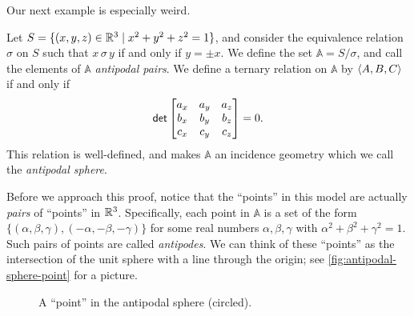 Our next example is especially weird.

\begin{prop}
Let \(S = \{ (x,y,z) \in \mathbb{R}^3 \mid x^2 + y^2 + z^2 = 1 \}\), and consider the equivalence relation \(\sigma\) on \(S\) such that \(x \,\sigma\, y\) if and only if \(y = \pm x\).
We define the set \(\mathbb{A} = S/\sigma\), and call the elements of \(\mathbb{A}\) \emph{antipodal pairs}.
We define a ternary relation on \(\mathbb{A}\) by \(\langle A, B, C \rangle\) if and only if \[ \mathsf{det} \begin{bmatrix} a_x & a_y & a_z \\ b_x & b_y & b_z \\ c_x & c_y & c_z \end{bmatrix} = 0. \] This relation is well-defined, and makes \(\mathbb{A}\) an incidence geometry which we call the \emph{antipodal sphere}.
\end{prop}

Before we approach this proof, notice that the ``points'' in this model are actually \emph{pairs} of ``points'' in \(\mathbb{R}^3\).
Specifically, each point in \(\mathbb{A}\) is a set of the form \( \{ (\alpha, \beta, \gamma), (-\alpha, -\beta, -\gamma) \} \) for some real numbers \(\alpha, \beta, \gamma\) with \(\alpha^2 + \beta^2 + \gamma^2 = 1\).
Such pairs of points are called \emph{antipodes}.
We can think of these ``points'' as the intersection of the unit sphere with a line through the origin; see \autoref{fig:antipodal-sphere-point} for a picture.

\begin{figure}[h]
\begin{center}
\caption{\label{fig:antipodal-sphere-point}A ``point'' in the antipodal sphere (circled).}
\end{center}
\end{figure}
